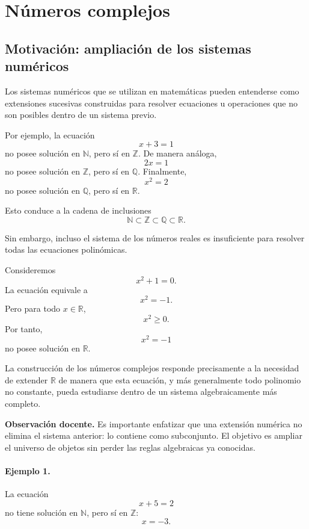 

\section{Números complejos}

\subsection{Motivación: ampliación de los sistemas numéricos}

Los sistemas numéricos que se utilizan en matemáticas pueden entenderse como
extensiones sucesivas construidas para resolver ecuaciones u operaciones que
no son posibles dentro de un sistema previo.

Por ejemplo, la ecuación
\[
x+3=1
\]
no posee solución en $\mathbb{N}$, pero sí en $\mathbb{Z}$. De manera análoga,
\[
2x=1
\]
no posee solución en $\mathbb{Z}$, pero sí en $\mathbb{Q}$. Finalmente,
\[
x^2=2
\]
no posee solución en $\mathbb{Q}$, pero sí en $\mathbb{R}$.

Esto conduce a la cadena de inclusiones
\[
\mathbb{N}\subset\mathbb{Z}\subset\mathbb{Q}\subset\mathbb{R}.
\]

Sin embargo, incluso el sistema de los números reales es insuficiente para
resolver todas las ecuaciones polinómicas.

Consideremos
\[
x^2+1=0.
\]
La ecuación equivale a
\[
x^2=-1.
\]
Pero para todo $x\in\mathbb{R}$,
\[
x^2\geq 0.
\]
Por tanto,
\[
x^2=-1
\]
no posee solución en $\mathbb{R}$.

La construcción de los números complejos responde precisamente a la necesidad
de extender $\mathbb{R}$ de manera que esta ecuación, y más generalmente todo
polinomio no constante, pueda estudiarse dentro de un sistema algebraicamente
más completo.

\textbf{Observación docente.}
Es importante enfatizar que una extensión numérica no elimina el sistema
anterior: lo contiene como subconjunto. El objetivo es ampliar el universo de
objetos sin perder las reglas algebraicas ya conocidas.

\paragraph{Ejemplo 1.}
La ecuación
\[
x+5=2
\]
no tiene solución en $\mathbb{N}$, pero sí en $\mathbb{Z}$:
\[
x=-3.
\]

